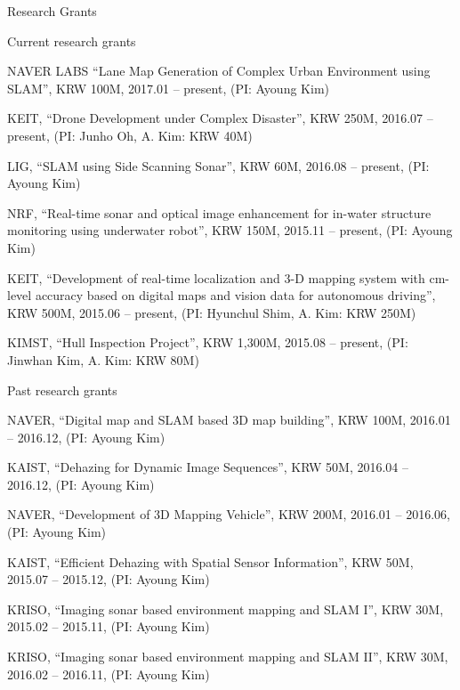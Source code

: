 \begin{rSection}{Research Grants}

\begin{pubSubsection}{Current research grants}
  \item NAVER LABS ``Lane Map Generation of Complex Urban Environment using SLAM'', KRW 100M, 2017.01 -- present, (PI: Ayoung Kim)
  \item KEIT, ``Drone Development under Complex Disaster'', KRW 250M, 2016.07 -- present, (PI: Junho Oh, A. Kim: KRW 40M)
  \item LIG, ``SLAM using Side Scanning Sonar'', KRW 60M, 2016.08 -- present, (PI: Ayoung Kim)
  \item NRF, ``Real-time sonar and optical image enhancement for in-water structure monitoring using underwater robot'', KRW 150M, 2015.11 -- present, (PI: Ayoung Kim)
  \item KEIT, ``Development of real-time localization and 3-D mapping system with cm-level accuracy based on digital maps and vision data for autonomous driving'', KRW 500M, 2015.06 -- present, (PI: Hyunchul Shim, A. Kim: KRW 250M)
  \item KIMST, ``Hull Inspection Project'', KRW 1,300M, 2015.08 -- present, (PI: Jinwhan Kim, A. Kim: KRW 80M)
\end{pubSubsection}

\begin{pubSubsection}{Past research grants}
  \item NAVER, ``Digital map and SLAM based 3D map building'', KRW 100M, 2016.01 -- 2016.12, (PI: Ayoung Kim)
  \item KAIST, ``Dehazing for Dynamic Image Sequences'', KRW 50M, 2016.04 -- 2016.12, (PI: Ayoung Kim)
  \item NAVER, ``Development of 3D Mapping Vehicle'', KRW 200M, 2016.01 -- 2016.06, (PI: Ayoung Kim)
  \item KAIST, ``Efficient Dehazing with Spatial Sensor Information'', KRW 50M, 2015.07 -- 2015.12, (PI: Ayoung Kim)
  \item KRISO, ``Imaging sonar based environment mapping and SLAM I'', KRW 30M, 2015.02 -- 2015.11, (PI: Ayoung Kim)
  \item KRISO, ``Imaging sonar based environment mapping and SLAM II'', KRW 30M, 2016.02 -- 2016.11, (PI: Ayoung Kim)
\end{pubSubsection}
\end{rSection}

